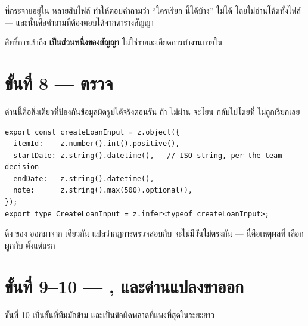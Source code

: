 \begin{badbox}[title={อย่าตรวจ \en{role} ข้างใน \en{service}}]
 ที่กระจายอยู่ใน 
หลายสิบไฟล์ ทำให้ตอบคำถามว่า ``ใครเรียก  นี้ได้บ้าง'' ไม่ได้
โดยไม่อ่านโค้ดทั้งไฟล์ --- และนั่นคือคำถามที่ต้องตอบได้จากตารางสัญญา

สิทธิ์การเข้าถึง \textbf{เป็นส่วนหนึ่งของสัญญา} ไม่ใช่รายละเอียดการทำงานภายใน
\end{badbox}

\section{ขั้นที่ 8 ---  ตรวจ }

ด่านนี้คือสิ่งเดียวที่ป้องกันข้อมูลผิดรูปได้จริงตอนรัน ถ้า  ไม่ผ่าน
 จะโยน  กลับไปโดยที่  ไม่ถูกเรียกเลย

\begin{lstlisting}
export const createLoanInput = z.object({
  itemId:    z.number().int().positive(),
  startDate: z.string().datetime(),   // ISO string, per the team decision
  endDate:   z.string().datetime(),
  note:      z.string().max(500).optional(),
});
export type CreateLoanInput = z.infer<typeof createLoanInput>;
\end{lstlisting}

\begin{keybox}[title={เขียน \en{schema} หนึ่งครั้ง ได้ทั้ง \en{validation} และ \en{type}}]
 ดึง  ของ  ออกมาจาก  เดียวกัน
แปลว่ากฎการตรวจสอบกับ  จะไม่มีวันไม่ตรงกัน --- นี่คือเหตุผลที่ 
เลือกผูกกับ  ตั้งแต่แรก
\end{keybox}

\section{ขั้นที่ 9--10 --- ,  และด่านแปลงขาออก}

ขั้นที่ 10 เป็นขั้นที่ทีมมักข้าม และเป็นข้อผิดพลาดที่แพงที่สุดในระยะยาว

